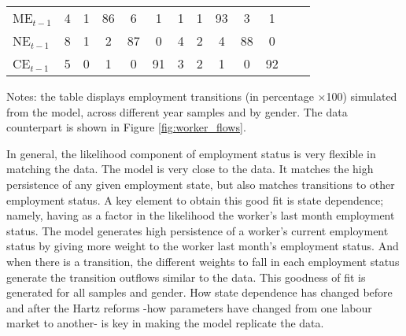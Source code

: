 \documentclass[12pt, a4paper]{article}
\begin{document}
\begin{table}[!t]
{{\begin{threeparttable}
\begin{tabular} {@{} l | c  c  c  c  c | c  c  c  c  c | c  c |  @{}}
					ME$_{t-1}$		&4&1&86&6&1		&1&1&93&3&1\\[1mm]
					NE$_{t-1}$  	&8&1&2&87&0		&4&2&4&88&0\\[1mm]
					CE$_{t-1}$ 		&5&0&1&0&91		&3&2&1&0&92\\[1mm]
					\hline
				\end{tabular}
				\begin{tablenotes}
					\item {Notes: the table displays employment transitions (in percentage $\times$100) simulated from the model, across different year samples and by gender. The data counterpart is shown in Figure \ref{fig:worker_flows}.} 
				\end{tablenotes}
	\end{threeparttable}}}
\end{table}


In general, the likelihood component of employment status is very flexible in matching the data. The model is very close to the data. It matches the high persistence of any given employment state, but also matches transitions to other employment status. A key element to obtain this good fit is state dependence; namely, having as a factor in the likelihood the worker's last month employment status. The model generates high persistence of a worker's current employment status by giving more weight to the worker last month's employment status. And when there is a transition, the different weights to fall in each employment status generate the transition outflows similar to the data. This goodness of fit is generated for all samples and gender. How state dependence has changed before and after the Hartz reforms -how parameters have changed from one labour market to another- is key in making the model replicate the data.
\end{document}
